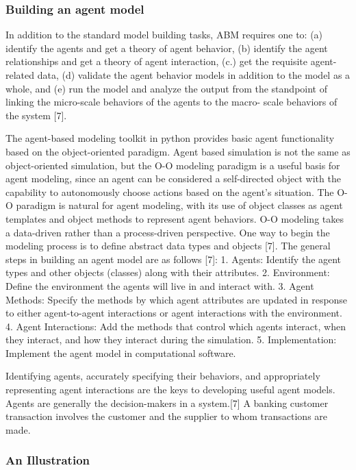 \documentclass[]{article}
\begin{document}
\subsubsection{Building an agent model}
In addition to the standard model building
tasks, ABM requires one to: (a) identify the agents and get a theory of
agent behavior, (b) identify the agent relationships and get a theory of
agent interaction, (c.) get the requisite agent-related data, (d)
validate the agent behavior models in addition to the model as a whole,
and (e) run the model and analyze the output from the standpoint of
linking the micro-scale behaviors of the agents to the macro- scale
behaviors of the system {[}7{]}.

The agent-based modeling toolkit in python provides basic agent
functionality based on the object-oriented paradigm. Agent based
simulation is not the same as object-oriented simulation, but the O-O
modeling paradigm is a useful basis for agent modeling, since an agent
can be considered a self-directed object with the capability to
autonomously choose actions based on the agent's situation. The O-O
paradigm is natural for agent modeling, with its use of object classes
as agent templates and object methods to represent agent behaviors. O-O
modeling takes a data-driven rather than a process-driven perspective.
One way to begin the modeling process is to define abstract data types
and objects {[}7{]}. The general steps in building an agent model are as
follows {[}7{]}: 1. Agents: Identify the agent types and other objects
(classes) along with their attributes. 2. Environment: Define the
environment the agents will live in and interact with. 3. Agent Methods:
Specify the methods by which agent attributes are updated in response to
either agent-to-agent interactions or agent interactions with the
environment. 4. Agent Interactions: Add the methods that control which
agents interact, when they interact, and how they interact during the
simulation. 5. Implementation: Implement the agent model in
computational software.

Identifying agents, accurately specifying their behaviors, and
appropriately representing agent interactions are the keys to developing
useful agent models. Agents are generally the decision-makers in a
system.{[}7{]} A banking customer transaction involves the customer and
the supplier to whom transactions are made. 

\subsubsection{An Illustration}
\end{document}
